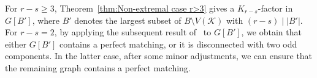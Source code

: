 \documentclass[11pt, a4paper]{article}
\theoremstyle{definition}
\newcommand{\<}{\subseteq}
\begin{document}


{For $r-s\geq 3$, Theorem~\ref{thm:Non-extremal case r>3} gives a $K_{r-s}$-factor in $G[B']$, where $B'$ denotes the largest subset of $B\setminus V(\mathcal{K})$ with $(r-s)\mid |B'|$.  %
For $r-s=2$, by applying the subsequent  result of~\cite{gan2024} to $G[B']$, we obtain that either $G[B']$ contains a perfect matching, or it is disconnected with  two odd components. 
In the latter case, after some minor adjustments, we can ensure that the remaining graph contains a perfect matching.} 
\end{document}
